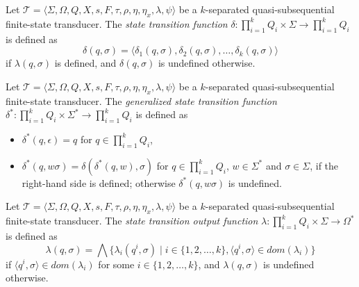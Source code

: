 \begin{definition}
  Let $\mathcal{T} = \langle \Sigma, \Omega, Q, X, s, F, \tau, \rho, \eta, \eta_x,
  \lambda, \psi \rangle$ be a $k$-separated quasi-subsequential finite-state
  transducer. The \emph{state transition function} $\delta : \prod_{i=1}^k Q_i \times
  \Sigma \rightarrow \prod_{i=1}^k Q_i$ is defined as
  \begin{equation*}
    \delta(q, \sigma) = \langle \delta_1(q, \sigma), \delta_2(q, \sigma), \ldots,
    \delta_k(q, \sigma) \rangle
  \end{equation*}
  if $\lambda(q, \sigma)$ is defined, and $\delta(q, \sigma)$ is undefined otherwise.
\end{definition}

\begin{definition}
  Let $\mathcal{T} = \langle \Sigma, \Omega, Q, X, s, F, \tau, \rho, \eta, \eta_x,
  \lambda, \psi \rangle$ be a $k$-separated quasi-subsequential finite-state
  transducer. The \emph{generalized state transition function} $\delta^* :
  \prod_{i=1}^k Q_i \times \Sigma^* \rightarrow \prod_{i=1}^k Q_i$ is defined as
  \begin{itemize}
    \item $\delta^*(q, \epsilon) = q$ for $q \in \prod_{i=1}^k Q_i$,
    \item $\delta^*(q, w\sigma) = \delta(\delta^*(q, w), \sigma)$ for $q \in
	    \prod_{i=1}^k Q_i$, $w \in \Sigma^*$ and $\sigma \in \Sigma$, if the
	    right-hand side is defined; otherwise $\delta^*(q, w\sigma)$ is undefined.
  \end{itemize}
\end{definition}

\begin{definition}
  Let $\mathcal{T} = \langle \Sigma, \Omega, Q, X, s, F, \tau, \rho, \eta, \eta_x,
  \lambda, \psi \rangle$ be a $k$-separated quasi-subsequential finite-state
  transducer. The \emph{state transition output function} $\lambda : \prod_{i=1}^k Q_i
  \times \Sigma \rightarrow \Omega^*$ is defined as
  \begin{equation*}
    \lambda(q, \sigma) = \bigwedge \{ \lambda_i(q^i, \sigma) \mid i \in \{ 1, 2,
    \ldots, k \}, \langle q^i, \sigma \rangle \in dom(\lambda_i) \}
  \end{equation*}
  if $\langle q^i, \sigma \rangle \in dom(\lambda_i)$ for some $i \in \{ 1, 2, \ldots,
  k \}$, and $\lambda(q, \sigma)$ is undefined otherwise.
\end{definition}


